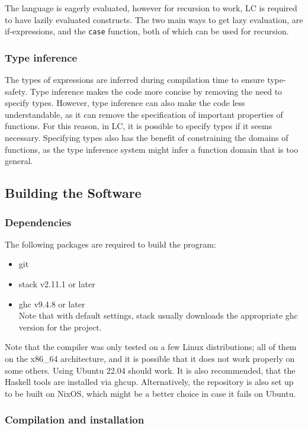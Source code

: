 \documentclass[12pt]{article}
\begin{document}
The language is eagerly evaluated, however for recursion to work, LC is required
to have lazily evaluated constructs. The two main ways to get lazy evaluation,
are if-expressions, and the \verb$case$ function, both of which can be used for
recursion.

\subsubsection{Type inference}

The types of expressions are inferred during compilation time to ensure
type-safety. Type inference makes the code more concise by removing the need to
specify types. However, type inference can also make the code less
understandable, as it can remove the specification of important properties of
functions. For this reason, in LC, it is possible to specify types if it seems
necessary. Specifying types also has the benefit of constraining the domains of
functions, as the type inference system might infer a function domain that is
too general.

\subsection{Building the Software}
\subsubsection{Dependencies}

The following packages are required to build the program:
\begin{itemize}
    \item git
    \item stack v2.11.1 or later
    \item ghc v9.4.8 or later \\ Note that with default settings, stack usually
        downloads the appropriate ghc version for the project.
\end{itemize}
Note that the compiler was only tested on a few Linux distributions; all of them
on the x86\_64 architecture, and it is possible that it does not work properly
on some others. Using Ubuntu 22.04 should work. It is also recommended, that the
Haskell tools are installed via ghcup. Alternatively, the repository is also set
up to be built on NixOS, which might be a better choice in case it fails on
Ubuntu.

\subsubsection{Compilation and installation}
\end{document}
